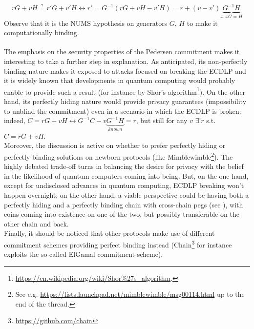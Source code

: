 \begin{equation*}
    rG + vH \overset{?}{=}r'G + v'H \leftrightarrow r' = G^{-1}(rG + vH - v'H) = r + (v - v')\underbrace{G^{-1}H}_{x: xG = H}
\end{equation*}
Observe that it is the NUMS hypothesis on generators $G$, $H$ to make it computationally binding.\\ \ \\
The emphasis on the security properties of the Pedersen commitment makes it interesting to take a further step in explanation. As anticipated, its non-perfectly binding nature makes it exposed to attacks focused on breaking the ECDLP and it is widely known that developments in quantum computing would probably enable to provide such a result (for instance by Shor's algorithm\footnote{\url{https://en.wikipedia.org/wiki/Shor\%27s_algorithm}.}). On the other hand, its perfectly hiding nature would provide privacy guarantees (impossibility to unblind the commitment) even in a scenario in which the ECDLP is broken: indeed, $C = rG + vH \leftrightarrow G^{-1}C - v\underbrace{G^{-1}H}_{known} = r$, but still for any $v$ $\exists! r$ s.t. $C = rG + vH$.\\
Moreover, the discussion is active on whether to prefer perfectly hiding or perfectly binding solutions on newborn protocols (like Mimblewimble\footnote{See e.g. \url{https://lists.launchpad.net/mimblewimble/msg00114.html} up to the end of the thread.}). The highly debated trade-off turns in balancing the desire for privacy with the belief in the likelihood of quantum computers coming into being. But, on the one hand, except for undisclosed advances in quantum computing, ECDLP breaking won't happen overnight; on the other hand, a viable perspective could be having both a perfectly hiding and a perfectly binding chain with cross-chain pegs (see \cite{Sidechain}), with coins coming into existence on one of the two, but possibly transferable on the other chain and back.\\
Finally, it should be noticed that other protocols make use of different commitment schemes providing perfect binding instead (Chain\footnote{\url{https://github.com/chain}} for instance exploits the so-called ElGamal commitment scheme).

